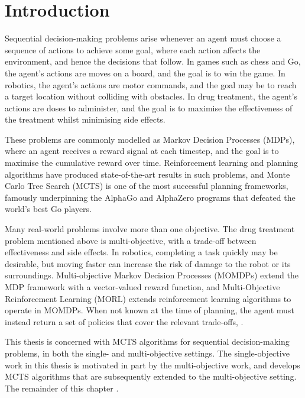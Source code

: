 
\chapter{\label{ch:1-intro}Introduction} 

    \minitoc

    Sequential decision-making problems arise whenever an agent must choose a sequence of actions to achieve some goal, where each action affects the environment, and hence the decisions that follow. In games such as chess and Go, the agent's actions are moves on a board, and the goal is to win the game. In robotics, the agent's actions are motor commands, and the goal may be to reach a target location without colliding with obstacles. In drug treatment, the agent's actions are doses to administer, and the goal is to maximise the effectiveness of the treatment whilst minimising side effects.

    These problems are commonly modelled as Markov Decision Processes (MDPs), where an agent receives a reward signal at each timestep, and the goal is to maximise the cumulative reward over time. Reinforcement learning and planning algorithms have produced state-of-the-art results in such problems, and Monte Carlo Tree Search (MCTS) is one of the most successful planning frameworks, famously underpinning the AlphaGo and AlphaZero programs that defeated the world's best Go players. 

    Many real-world problems involve more than one objective. The drug treatment problem mentioned above is multi-objective, with a trade-off between effectiveness and side effects. In robotics, completing a task quickly may be desirable, but moving faster can increase the risk of damage to the robot or its surroundings. Multi-objective Markov Decision Processes (MOMDPs) extend the MDP framework with a vector-valued reward function, and Multi-Objective Reinforcement Learning (MORL) extends reinforcement learning algorithms to operate in MOMDPs.  When  not known at the time of planning, the agent must instead return a set of policies that cover the relevant trade-offs, .

    This thesis is concerned with MCTS algorithms for sequential decision-making problems, in both the single- and multi-objective settings. The single-objective work in this thesis is motivated in part by the multi-objective work, and develops MCTS algorithms that are subsequently extended to the multi-objective setting. The remainder of this chapter .


